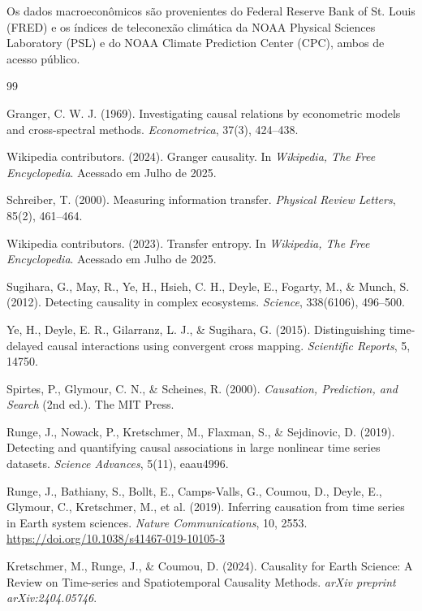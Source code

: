 \documentclass[12pt, a4paper]{article}
\begin{document}
Os dados macroeconômicos são provenientes do Federal Reserve Bank of St. Louis (FRED) e os índices de teleconexão climática da NOAA Physical Sciences Laboratory (PSL) e do NOAA Climate Prediction Center (CPC), ambos de acesso público.
\begin{thebibliography}{99}


Granger, C. W. J. (1969). Investigating causal relations by econometric models and cross-spectral methods. \textit{Econometrica}, 37(3), 424--438.

Wikipedia contributors. (2024). Granger causality. In \textit{Wikipedia, The Free Encyclopedia}. Acessado em Julho de 2025.

Schreiber, T. (2000). Measuring information transfer. \textit{Physical Review Letters}, 85(2), 461--464.

Wikipedia contributors. (2023). Transfer entropy. In \textit{Wikipedia, The Free Encyclopedia}. Acessado em Julho de 2025.

Sugihara, G., May, R., Ye, H., Hsieh, C. H., Deyle, E., Fogarty, M., \& Munch, S. (2012). Detecting causality in complex ecosystems. \textit{Science}, 338(6106), 496--500.

Ye, H., Deyle, E. R., Gilarranz, L. J., \& Sugihara, G. (2015). Distinguishing time-delayed causal interactions using convergent cross mapping. \textit{Scientific Reports}, 5, 14750.

Spirtes, P., Glymour, C. N., \& Scheines, R. (2000). \textit{Causation, Prediction, and Search} (2nd ed.). The MIT Press.

Runge, J., Nowack, P., Kretschmer, M., Flaxman, S., \& Sejdinovic, D. (2019). Detecting and quantifying causal associations in large nonlinear time series datasets. \textit{Science Advances}, 5(11), eaau4996.

Runge, J., Bathiany, S., Bollt, E., Camps-Valls, G., Coumou, D., Deyle, E., Glymour, C., Kretschmer, M., et al. (2019). Inferring causation from time series in Earth system sciences. \textit{Nature Communications}, 10, 2553. \url{https://doi.org/10.1038/s41467-019-10105-3}

Kretschmer, M., Runge, J., \& Coumou, D. (2024). Causality for Earth Science: A Review on Time-series and Spatiotemporal Causality Methods. \textit{arXiv preprint arXiv:2404.05746}.


\end{thebibliography}
\end{document}
